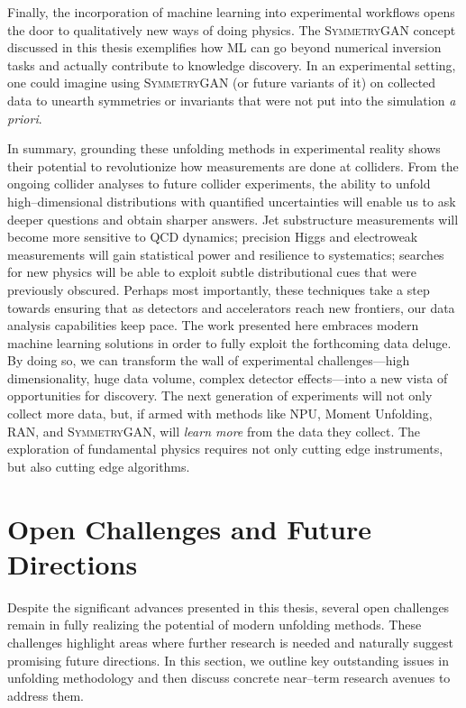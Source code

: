         Finally, the incorporation of machine learning into experimental workflows opens the door to qualitatively new ways of doing physics.
        The \textsc{SymmetryGAN} concept discussed in this thesis exemplifies how ML can go beyond numerical inversion tasks and actually contribute to {knowledge discovery}.
        In an experimental setting, one could imagine using \textsc{SymmetryGAN} (or future variants of it) on collected data to unearth symmetries or invariants that were not put into the simulation \textit{a priori}.
    
        In summary, grounding these unfolding methods in experimental reality shows their potential to revolutionize how measurements are done at colliders.
        From the ongoing collider analyses to future collider experiments, the ability to unfold high--dimensional distributions with quantified uncertainties will enable us to ask deeper questions and obtain sharper answers.
        Jet substructure measurements will become more sensitive to QCD dynamics;
        precision Higgs and electroweak measurements will gain statistical power and resilience to systematics;
        searches for new physics will be able to exploit subtle distributional cues that were previously obscured.
        Perhaps most importantly, these techniques take a step towards ensuring that as detectors and accelerators reach new frontiers, our data analysis capabilities keep pace.
        The work presented here embraces modern machine learning solutions in order to fully exploit the forthcoming data deluge.
        By doing so, we can transform the wall of experimental challenges---high dimensionality, huge data volume, complex detector effects---into a new vista of opportunities for discovery.
        The next generation of experiments will not only collect more data, but, if armed with methods like NPU, Moment Unfolding, RAN, and \textsc{SymmetryGAN}, will \emph{learn more} from the data they collect.
        The exploration of fundamental physics requires not only cutting edge instruments, but also cutting edge algorithms.

\section{Open Challenges and Future Directions}
    Despite the significant advances presented in this thesis, several open challenges remain in fully realizing the potential of modern unfolding methods.
    These challenges highlight areas where further research is needed and naturally suggest promising future directions.
    In this section, we outline key outstanding issues in unfolding methodology and then discuss concrete near--term research avenues to address them.
        

